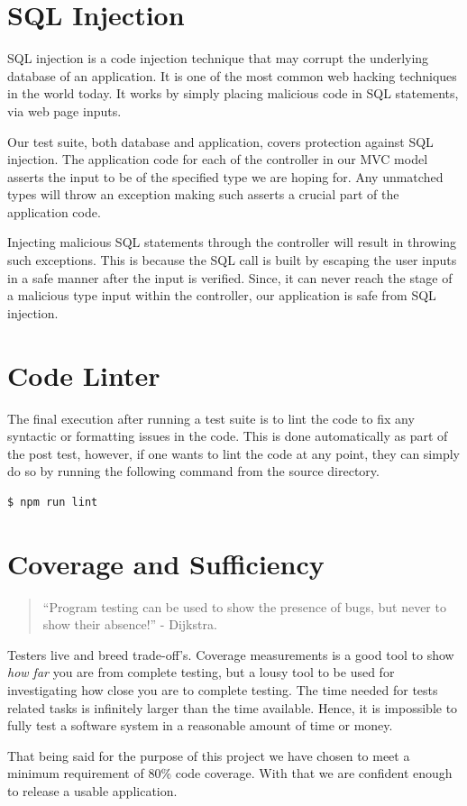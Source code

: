 \documentclass[fontsize=12pt,paper=letter,twoside]{scrartcl}
\begin{document}
\newpage
\section{SQL Injection}
SQL injection is a code injection technique that may corrupt the underlying database of an application. It is one of the most common web hacking techniques in the world today. It works by simply placing malicious code in SQL statements, via web page inputs.

\bigskip
\noindent Our test suite, both database and application, covers protection against SQL injection. The application code for each of the controller in our MVC model asserts the input to be of the specified type we are hoping for. Any unmatched types will throw an exception making such asserts a crucial part of the application code.

\bigskip
\noindent Injecting malicious SQL statements through the controller will result in throwing such exceptions. This is because the SQL call is built by escaping the user inputs in a safe manner after the input is verified. Since, it can never reach the stage of a malicious type input within the controller, our application is safe from SQL injection.

\section{Code Linter}
The final execution after running a test suite is to lint the code to fix any syntactic or formatting issues in the code. This is done automatically as part of the post test, however, if one wants to lint the code at any point, they can simply do so by running the following command from the source directory.


\begin{lstlisting}[language=bash]
	$ npm run lint
\end{lstlisting}

\section{Coverage and Sufficiency}
\begin{quote}
``Program testing can be used to show the presence of bugs, but never to show their absence!'' - Dijkstra.
\end{quote}

\noindent Testers live and breed trade-off's. Coverage measurements is a good tool to show \emph{how far} you are from complete testing, but a lousy tool to be used for investigating how close you are to complete testing. The time needed for tests related tasks is infinitely larger than the time available. Hence, it is impossible to fully test a software system in a reasonable amount of time or money.

\bigskip
\noindent That being said for the purpose of this project we have chosen to meet a minimum requirement of 80\% code coverage. With that we are confident enough to release a usable application.
\end{document}
